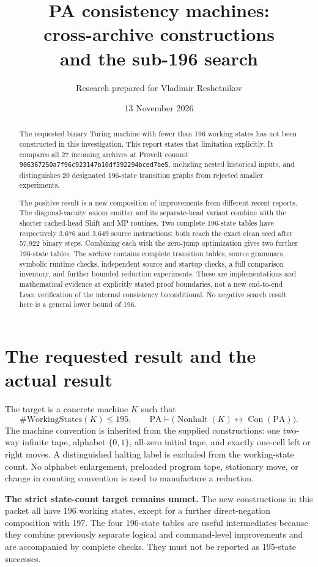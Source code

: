 \documentclass[11pt,letterpaper]{article}
\title{PA consistency machines:\\cross-archive constructions\\and the sub-196 search}
\author{Research prepared for Vladimir Reshetnikov}
\date{13 November 2026}
\newcommand{\PA}{\mathrm{PA}}
\newcommand{\Con}{\operatorname{Con}}
\newcommand{\NH}{\operatorname{Nonhalt}}
\newcommand{\file}[1]{\texttt{\nolinkurl{#1}}}
\begin{document}
\maketitle
\begin{abstract}
The requested binary Turing machine with fewer than 196 working states
has not been constructed in this investigation. This report states that
limitation explicitly. It compares all 27 incoming archives at ProveIt
commit \file{906367250a7f96c923147b10df392294bced7be5}, including nested
historical inputs, and distinguishes 20 designated 196-state transition
graphs from rejected smaller experiments.

The positive result is a new composition of improvements from different
recent reports. The diagonal-vacuity axiom emitter and its separate-head
variant combine with the shorter cached-head Shift and MP routines.
Two complete 196-state tables have respectively 3,676 and 3,649 source
instructions; both reach the exact clean seed after 57,922 binary steps.
Combining each with the zero-jump optimization gives two further 196-state
tables. The archive contains complete transition tables, source grammars,
symbolic runtime checks, independent source and startup checks, a full
comparison inventory, and further bounded reduction experiments. These
are implementations and mathematical evidence at explicitly stated proof
boundaries, not a new end-to-end Lean verification of the internal
consistency biconditional. No negative search result here is a general
lower bound of 196.
\end{abstract}
\tableofcontents
\clearpage

\section{The requested result and the actual result}

The target is a concrete machine $K$ such that
\[
 \#\mathrm{WorkingStates}(K)\le195,
 \qquad
 \PA\vdash\bigl(\NH(K)\leftrightarrow\Con(\PA)\bigr).
\]
The machine convention is inherited from the supplied constructions:
one two-way infinite tape, alphabet $\{0,1\}$, all-zero initial tape,
and exactly one-cell left or right moves. A distinguished halting label
is excluded from the working-state count. No alphabet enlargement,
preloaded program tape, stationary move, or change in counting convention
is used to manufacture a reduction.

\textbf{The strict state-count target remains unmet.} The new constructions
in this packet all have 196 working states, except for a further
direct-negation composition with 197. The four 196-state tables are useful
intermediates because they combine previously separate logical and
command-level improvements and are accompanied by complete checks.
They must not be reported as 195-state successes.
\end{document}
